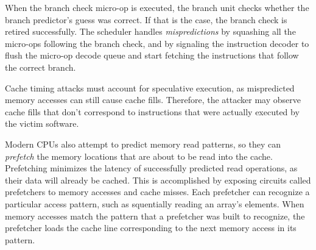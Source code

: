 When the branch check micro-op is executed, the branch unit checks whether the
branch predictor's guess was correct. If that is the case, the branch check is
retired successfully. The scheduler handles \textit{mispredictions} by
squashing all the micro-ops following the branch check, and by signaling the
instruction decoder to flush the micro-op decode queue and start fetching the
instructions that follow the correct branch.

Cache timing attacks must account for speculative execution, as mispredicted
memory accesses can still cause cache fills. Therefore, the attacker may
observe cache fills that don't correspond to instructions that were actually
executed by the victim software.


Modern CPUs also attempt to predict memory read patterns, so they can
\textit{prefetch} the memory locations that are about to be read into the
cache. Prefetching minimizes the latency of successfully predicted read
operations, as their data will already be cached. This is accomplished by
exposing circuits called prefetchers to memory accesses and cache misses. Each
prefetcher can recognize a particular access pattern, such as squentially
reading an array's elements. When memory accesses match the pattern that a
prefetcher was built to recognize, the prefetcher loads the cache line
corresponding to the next memory access in its pattern.
